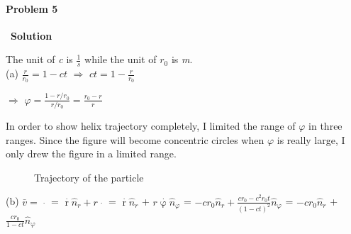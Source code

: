\documentclass[12pt,a4paper]{article}
\begin{document}
\paragraph{\large \textbf{Problem 5}}~{\textbf{Solution}}
\vspace{2mm}
\par The unit of \textit{c} is $\frac{1}{s}$ while the unit of $r_0$ is \textit{m}. \\
\noindent (a) $\frac{r}{r_0} = 1 - ct$ $\Rightarrow$ $ct = 1 - \frac{r}{r_0}$ 
\par $\Rightarrow$ $\varphi = \frac{1-r/r_0}{r/r_0} = \frac{r_0-r}{r}$
\par In order to show helix trajectory completely, I limited the range of $\varphi$ in three ranges. Since the figure will become concentric circles when $\varphi$ is really large, I only drew the figure in a limited range.
\begin{figure}[H]
    \centering
    \caption{Trajectory of the particle}
\end{figure}
\noindent (b) $\bar{v} = \mathop{\bar{r}}\limits^{\cdot}$ = $\mathop{r}\limits^{\cdot}\hat{n}_r + r\mathop{\hat{n}_r}\limits^{\cdot}$ = $\mathop{r}\limits^{\cdot}\hat{n}_r$ + $r\mathop{\varphi}\limits^{\cdot}\hat{n}_\varphi$ = $-cr_0 \hat{n}_r + \frac{cr_0-c^2r_0t}{(1-ct)^2}\hat{n}_\varphi$ = $-cr_0 \hat{n}_r$ + $\frac{cr_0}{1-ct}\hat{n}_\varphi$\\
\end{document}
